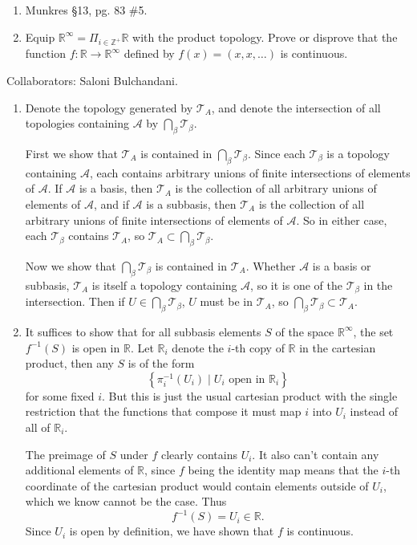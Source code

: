 \documentclass[10pt]{report}
\begin{document}
\begin{exer}[6 points]
\begin{enumerate}
	\item Munkres \S 13, pg. 83 \#5.
	\item Equip $\mathbb{R}^{\infty}=\Pi_{i \in \mathbb{Z}^+}\mathbb{R}$ with the product topology. Prove or disprove that the function $f:\mathbb{R}\to \mathbb{R}^{\infty}$ defined by $f(x)=(x,x,\dots)$ is continuous.
\end{enumerate}
\end{exer}
{\color{blue}Collaborators: Saloni Bulchandani.}

\begin{enumerate}
	\item Denote the topology generated by $\mathcal{T}_{A}$, and denote the intersection of all topologies containing $\mathcal{A}$ by $\bigcap_{\beta}\mathcal{T}_{\beta}$.

		First we show that $\mathcal{T}_{A}$ is contained in $\bigcap_{\beta}\mathcal{T}_{\beta}$. Since each $\mathcal{T}_{\beta}$ is a topology containing $\mathcal{A}$, each contains arbitrary unions of finite intersections of elements of $\mathcal{A}$. If $\mathcal{A}$ is a basis, then $\mathcal{T}_A$ is the collection of all arbitrary unions of elements of $\mathcal{A}$, and if $\mathcal{A}$ is a subbasis, then $\mathcal{T}_{A}$ is the collection of all arbitrary unions of finite intersections of elements of $\mathcal{A}$. So in either case, each $\mathcal{T}_{\beta}$ contains $\mathcal{T}_{A}$, so $\mathcal{T}_{A} \subset \bigcap_{\beta}\mathcal{T}_{\beta}$.

		Now we show that $\bigcap_{\beta}\mathcal{T}_{\beta}$ is contained in $\mathcal{T}_{A}$. Whether $\mathcal{A}$ is a basis or subbasis, $\mathcal{T}_{A}$ is itself a topology containing $\mathcal{A}$, so it is one of the $\mathcal{T}_{\beta}$ in the intersection. Then if $U \in \bigcap_{\beta}\mathcal{T}_{\beta}$, $U$ must be in $\mathcal{T}_{A}$, so $\bigcap_{\beta}\mathcal{T}_{\beta}\subset \mathcal{T}_{A}$.

	\item It suffices to show that for all subbasis elements $S$ of the space $\mathbb{R}^\infty$, the set $f^{-1}(S)$ is open in $\mathbb{R}$. Let $\mathbb{R}_i$ denote the $i$-th copy of $\mathbb{R}$ in the cartesian product, then any $S$ is of the form
		\[
			\left\{ \pi_{i}^{-1}(U_{i}) \;|\; U_i \text{ open in } \mathbb{R}_i \right\}
		\] for some fixed $i$. But this is just the usual cartesian product with the single restriction that the functions that compose it must map $i$ into $U_i$ instead of all of $\mathbb{R}_i$.

		The preimage of $S$ under $f$ clearly contains $U_i$. It also can't contain any additional elements of $\mathbb{R}$, since $f$ being the identity map means that the $i$-th coordinate of the cartesian product would contain elements outside of $U_i$, which we know cannot be the case. Thus
		\[
			f^{-1}(S) = U_i \in \mathbb{R}.
		\] Since $U_i$ is open by definition, we have shown that $f$ is continuous.
\end{enumerate}
\pagebreak
\end{document}
